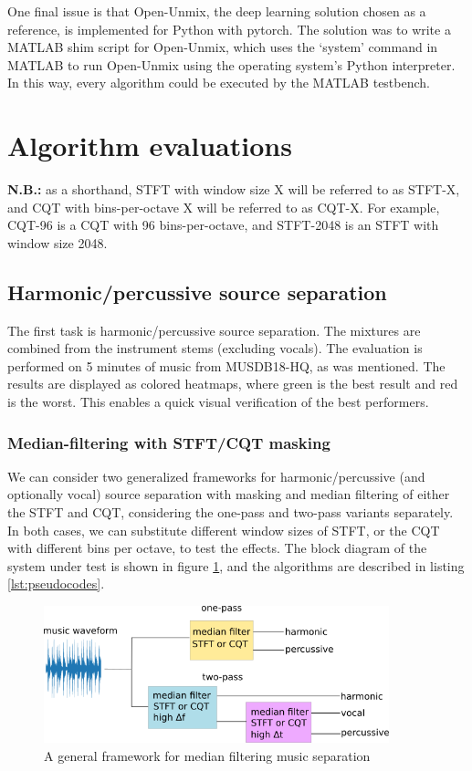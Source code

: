 \documentclass[letter,12pt]{article}
\begin{document}
One final issue is that Open-Unmix, the deep learning solution chosen as a reference, is implemented for Python with pytorch\cite{pytorch}. The solution was to write a MATLAB shim script for Open-Unmix, which uses the `system' command in MATLAB to run Open-Unmix using the operating system's Python interpreter. In this way, every algorithm could be executed by the MATLAB testbench.

\section{Algorithm evaluations}
\label{sec:elim}

\textbf{N.B.:} as a shorthand, STFT with window size X will be referred to as STFT-X, and CQT with bins-per-octave X will be referred to as CQT-X. For example, CQT-96 is a CQT with 96 bins-per-octave, and STFT-2048 is an STFT with window size 2048.

\subsection{Harmonic/percussive source separation}

The first task is harmonic/percussive source separation. The mixtures are combined from the instrument stems (excluding vocals). The evaluation is performed on 5 minutes of music from MUSDB18-HQ, as was mentioned. The results are displayed as colored heatmaps, where green is the best result and red is the worst. This enables a quick visual verification of the best performers.

\subsubsection{Median-filtering with STFT/CQT masking}
\label{subsec:mfilthpss}

We can consider two generalized frameworks for harmonic/percussive (and optionally vocal) source separation with masking and median filtering of either the STFT and CQT, considering the one-pass and two-pass variants separately. In both cases, we can substitute different window sizes of STFT, or the CQT with different bins per octave, to test the effects. The block diagram of the system under test is shown in figure \ref{fig:fitz2}, and the algorithms are described in listing \ref{lst:pseudocodes}.

\begin{figure}[ht]
	\centering
	\includegraphics[width=10cm]{./medianfiltdiagram.png}
	\caption{A general framework for median filtering music separation}
	\label{fig:fitz2}
\end{figure}
\end{document}
